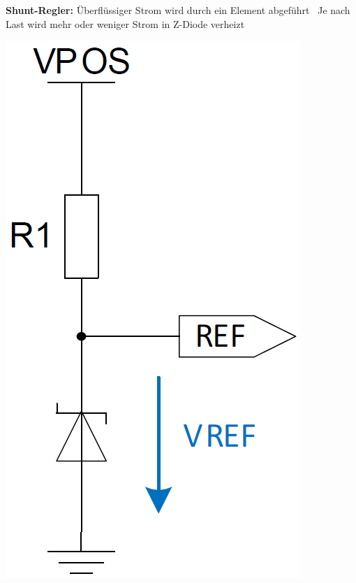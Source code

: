 \textbf{Shunt-Regler:} Überflüssiger Strom wird durch ein Element abgeführt 
    \textrightarrow\ Je nach Last wird mehr oder weniger Strom in Z-Diode verheizt

\begin{minipage}[c]{0.15\columnwidth}
    \includegraphics[width=\columnwidth]{images/spannungsreferenz_z-diode.png}
\end{minipage}
\hfill
